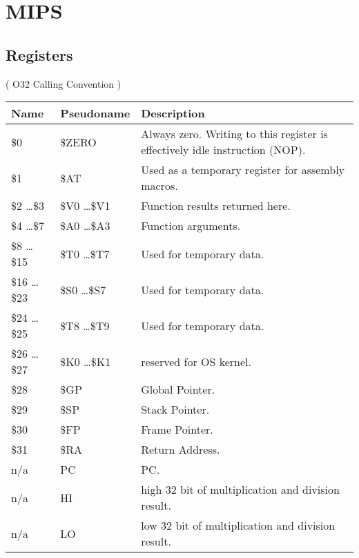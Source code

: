 \ifx\RUSSIAN\undefined
\chapter{MIPS}

\section{Registers}
\label{MIPS_registers_ref}

( O32 Calling Convention )

\begin{center}
\begin{tabular}{ | l | l | l | }
\hline
\cellcolor{blue!25} Name & \cellcolor{blue!25} Pseudoname & \cellcolor{blue!25} Description \\
\hline
\$0             & \$ZERO          & Always zero. Writing to this register is effectively idle instruction (\ac{NOP}). \\
\hline
\$1             & \$AT            & Used as a temporary register for assembly macros. \\
\hline
\$2 \dots \$3   & \$V0 \dots \$V1 & Function results returned here. \\
\hline
\$4 \dots \$7   & \$A0 \dots \$A3 & Function arguments. \\
\hline
\$8 \dots \$15  & \$T0 \dots \$T7 & Used for temporary data. \\
\hline
\$16 \dots \$23 & \$S0 \dots \$S7 & Used for temporary data\AsteriskOne{}. \\
\hline
\$24 \dots \$25 & \$T8 \dots \$T9 & Used for temporary data. \\
\hline
\$26 \dots \$27 & \$K0 \dots \$K1 & reserved for OS kernel. \\
\hline
\$28            & \$GP            & Global Pointer\AsteriskTwo{}. \\
\hline
\$29            & \$SP            & Stack Pointer\AsteriskOne{}. \\
\hline
\$30            & \$FP            & Frame Pointer\AsteriskOne{}. \\
\hline
\$31            & \$RA            & Return Address. \\
\hline
n/a             & PC              & \ac{PC}. \\
\hline
n/a             & HI              & high 32 bit of multiplication and division result\AsteriskThree{}. \\
\hline
n/a             & LO              & low 32 bit of multiplication and division result\AsteriskThree{}. \\
\end{tabular}
\end{center}

